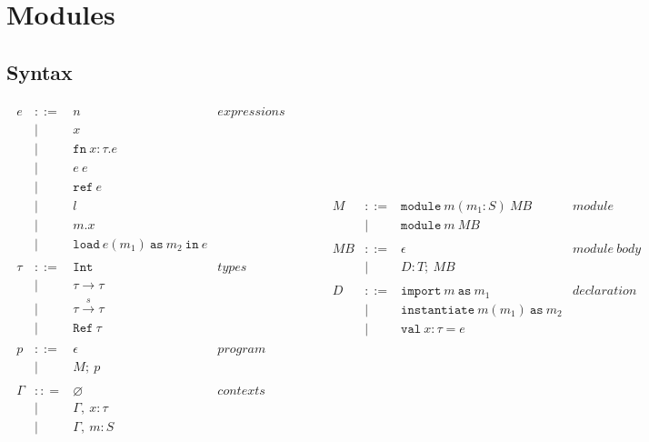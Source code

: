 \documentclass{llncs}
\newcommand{\keyw}[1]{\mathtt{#1}~}
\newcommand{\reftt}{\mathtt{ref}~}
\newcommand{\Reftt}{\mathtt{Ref}~}
\newcommand{\Inttt}{\mathtt{Int}~}
\begin{document}
\section{Modules}

\subsection{Syntax}

\[
\begin{array}{lll}
\begin{array}{lllr}
e & ::= & n & expressions \\
& | & x\\
& | & \keyw{fn} x : \tau . e \\
& | & e~e\\
& | & \reftt e \\
& | & l \\
& | & m.x \\
& | & \keyw{load} e(m_1)~\keyw{as} m_2~\keyw{in} e \\
&&\\
\tau & ::= & \Inttt & types \\
& | & \tau \rightarrow \tau \\
& | & \tau \xrightarrow{s} \tau \\
& | & \Reftt \tau \\
&&\\
p & ::= & \epsilon & program\\
& | & M;~p\\
&&\\
\Gamma & :: = & \varnothing & contexts\\
& | & \Gamma,~x : \tau\\
& | & \Gamma,~m : S\\
\end{array}
& ~~~~~~
&
\begin{array}{lllr}
M & ::= & \keyw{module} m (m_1 : S)~MB & module \\
& | & \keyw{module} m~MB \\
&&\\
MB & ::= & \epsilon & module~body\\
& | & D : T;~MB\\
&&\\
D & ::= & \keyw{import} m~\keyw{as} m_1 & declaration \\
& | & \keyw{instantiate} m(m_1)~\keyw{as} m_2 \\
& | & \keyw{val} x : \tau = e \\
&&\\

\end{array}
\end{array}\]
\end{document}
